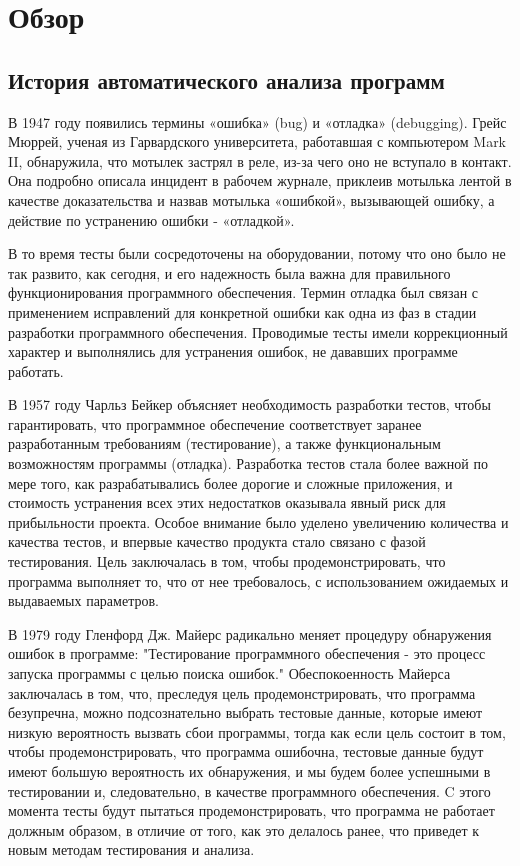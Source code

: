 \chapter{Обзор}\label{ch:ch1}

\section{История автоматического анализа программ}\label{sec:ch1/sec1}
В 1947 году появились термины «ошибка» (bug) и «отладка» (debugging). Грейс Мюррей, 
ученая из Гарвардского университета, работавшая с компьютером Mark II, обнаружила, 
что мотылек застрял в реле, из-за чего оно не вступало в контакт. Она подробно 
описала инцидент в рабочем журнале, приклеив мотылька лентой в качестве доказательства и 
назвав мотылька «ошибкой», вызывающей ошибку, а действие по устранению ошибки - «отладкой».

В то время тесты были сосредоточены на оборудовании, потому что оно было не так развито, как 
сегодня, и его надежность была важна для правильного функционирования программного обеспечения.
Термин отладка был связан с применением исправлений для конкретной ошибки как одна из фаз в 
стадии разработки программного обеспечения. Проводимые тесты имели коррекционный характер и 
выполнялись для устранения ошибок, не дававших программе работать. 

В 1957 году Чарльз Бейкер объясняет необходимость разработки тестов, чтобы гарантировать, что 
программное обеспечение соответствует заранее разработанным требованиям (тестирование), а также 
функциональным возможностям программы (отладка). Разработка тестов стала более важной по мере 
того, как разрабатывались более дорогие и сложные приложения, и стоимость устранения всех этих 
недостатков оказывала явный риск для прибыльности проекта. Особое внимание было уделено 
увеличению количества и качества тестов, и впервые качество продукта стало связано с фазой 
тестирования. Цель заключалась в том, чтобы продемонстрировать, что программа выполняет то, что 
от нее требовалось, с использованием ожидаемых и выдаваемых параметров.

В 1979 году Гленфорд Дж. Майерс радикально меняет процедуру обнаружения ошибок в программе:
"Тестирование программного обеспечения - это процесс запуска программы с целью поиска ошибок."
Обеспокоенность Майерса заключалась в том, что, преследуя цель продемонстрировать, что программа 
безупречна, можно подсознательно выбрать тестовые данные, которые имеют низкую вероятность 
вызвать сбои программы, тогда как если цель состоит в том, чтобы продемонстрировать, что 
программа ошибочна, тестовые данные будут имеют большую вероятность их обнаружения, и мы будем 
более успешными в тестировании и, следовательно, в качестве программного обеспечения. C этого
момента тесты будут пытаться продемонстрировать, что программа не работает должным образом, в 
отличие от того, как это делалось ранее, что приведет к новым методам тестирования и анализа.

